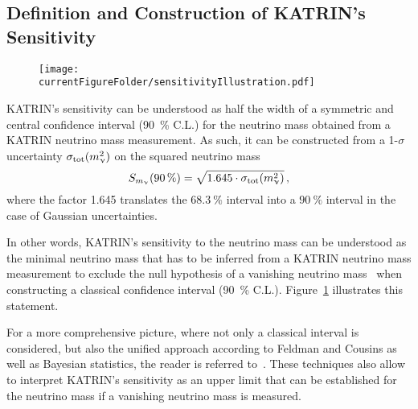 \subsection{Definition and Construction of KATRIN's Sensitivity}
\label{sec:statMethodsSensitivtyDef}
\begin{figure}
	\centering
	\texttt{[image: \\currentFigureFolder/sensitivityIllustration.pdf]}
	\label{fig:statMethodsSensitivity}
\end{figure}

KATRIN's sensitivity can be understood as half the width of a symmetric and central confidence interval (\SI{90}{\percent} C.L.) for the neutrino mass obtained from a KATRIN neutrino mass measurement. As such, it can be constructed from a 1-$\sigma$ uncertainty $\sigma_\mathrm{tot}(m_\upnu^2)$ on the squared neutrino mass~\cite{Angrik:2005ep}
\begin{equation}
\label{eq:statMethodsSensitivity}
S_{m_\upnu}(\SI{90}{\percent}) = \sqrt{1.645\cdot\sigma_\mathrm{tot}(m_\upnu^2)}
\text{\,,}
\end{equation}
where the factor 1.645 translates the $\SI{68.3}{\percent}$ interval into a $\SI{90}{\percent}$ interval in the case of Gaussian uncertainties.

In other words, KATRIN's sensitivity to the neutrino mass can be understood as the minimal neutrino mass that has to be inferred from a KATRIN neutrino mass measurement to exclude the null hypothesis of a vanishing neutrino mass~\cite{Kleesiek2014} when constructing a classical confidence interval (\SI{90}{\percent} C.L.). Figure~\ref{fig:statMethodsSensitivity} illustrates this statement.

For a more comprehensive picture, where not only a classical interval is considered, but also the unified approach according to Feldman and Cousins as well as Bayesian statistics, the reader is referred to~\cite{Kleesiek2019}. These techniques also allow to interpret KATRIN's sensitivity as an upper limit that can be established for the neutrino mass if a vanishing neutrino mass is measured.

